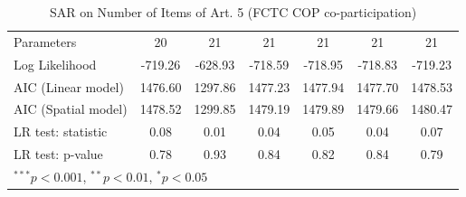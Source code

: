 \begin{table}[!h]
\begin{center}
\begin{tabular}{l c c c c c c }
Parameters              & 20           & 21           & 21           & 21           & 21           & 21           \\
Log Likelihood          & -719.26      & -628.93      & -718.59      & -718.95      & -718.83      & -719.23      \\
AIC (Linear model)      & 1476.60      & 1297.86      & 1477.23      & 1477.94      & 1477.70      & 1478.53      \\
AIC (Spatial model)     & 1478.52      & 1299.85      & 1479.19      & 1479.89      & 1479.66      & 1480.47      \\
LR test: statistic      & 0.08         & 0.01         & 0.04         & 0.05         & 0.04         & 0.07         \\
LR test: p-value        & 0.78         & 0.93         & 0.84         & 0.82         & 0.84         & 0.79         \\
\bottomrule
\multicolumn{7}{l}{\scriptsize{$^{***}p<0.001$, $^{**}p<0.01$, $^*p<0.05$}}
\end{tabular}
\caption{SAR on Number of Items of Art. 5 (FCTC COP co-participation)}
\label{table:coefficients}
\end{center}
\end{table}
